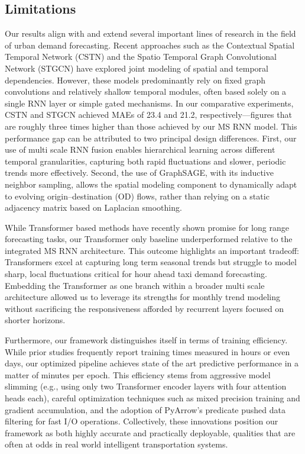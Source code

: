 \documentclass{article}
\begin{document}
\subsection{Limitations}

Our results align with and extend several important lines of research in the field of urban demand forecasting. Recent approaches such as the Contextual Spatial Temporal Network (CSTN) and the Spatio Temporal Graph Convolutional Network (STGCN) have explored joint modeling of spatial and temporal dependencies. However, these models predominantly rely on fixed graph convolutions and relatively shallow temporal modules, often based solely on a single RNN layer or simple gated mechanisms. In our comparative experiments, CSTN and STGCN achieved MAEs of 23.4 and 21.2, respectively—figures that are roughly three times higher than those achieved by our MS RNN model. This performance gap can be attributed to two principal design differences. First, our use of multi scale RNN fusion enables hierarchical learning across different temporal granularities, capturing both rapid fluctuations and slower, periodic trends more effectively. Second, the use of GraphSAGE, with its inductive neighbor sampling, allows the spatial modeling component to dynamically adapt to evolving origin–destination (OD) flows, rather than relying on a static adjacency matrix based on Laplacian smoothing.

While Transformer based methods have recently shown promise for long range forecasting tasks, our Transformer only baseline underperformed relative to the integrated MS RNN architecture. This outcome highlights an important tradeoff: Transformers excel at capturing long term seasonal trends but struggle to model sharp, local fluctuations critical for hour ahead taxi demand forecasting. Embedding the Transformer as one branch within a broader multi scale architecture allowed us to leverage its strengths for monthly trend modeling without sacrificing the responsiveness afforded by recurrent layers focused on shorter horizons.

Furthermore, our framework distinguishes itself in terms of training efficiency. While prior studies frequently report training times measured in hours or even days, our optimized pipeline achieves state of the art predictive performance in a matter of minutes per epoch. This efficiency stems from aggressive model slimming (e.g., using only two Transformer encoder layers with four attention heads each), careful optimization techniques such as mixed precision training and gradient accumulation, and the adoption of PyArrow's predicate pushed data filtering for fast I/O operations. Collectively, these innovations position our framework as both highly accurate and practically deployable, qualities that are often at odds in real world intelligent transportation systems.
\end{document}
